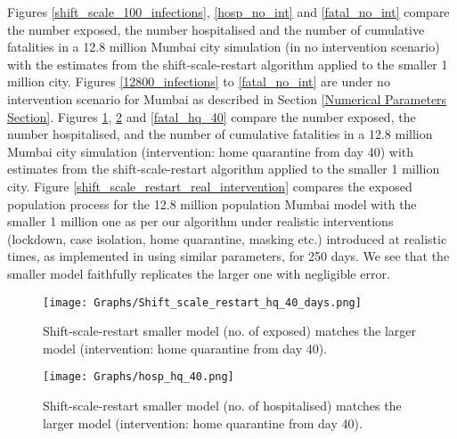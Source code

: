 \documentclass{article}
\theoremstyle{definition}
\begin{document}
Figures \ref{shift_scale_100_infections}, \ref{hosp_no_int} and \ref{fatal_no_int} compare the number exposed, the number hospitalised and the number of cumulative fatalities in a 12.8 million Mumbai city simulation (in no intervention scenario) with the estimates from the shift-scale-restart algorithm applied to the smaller 1 million city. Figures \ref{12800_infections} to \ref{fatal_no_int} are  under no intervention scenario for Mumbai
as described in Section \ref{Numerical Parameters Section}. Figures \ref{shift_scale_restart_1}, \ref{hosp_hq_40} and \ref{fatal_hq_40} compare
the  number exposed, the number  hospitalised, and the number of cumulative fatalities in a 12.8 million Mumbai city simulation (intervention: home quarantine from day 40) with estimates from the shift-scale-restart algorithm applied to the smaller 1 million city.
  Figure \ref{shift_scale_restart_real_intervention} compares the exposed population process for 
  the 12.8 million population Mumbai model with the smaller 1 million  one  as per our algorithm  
under realistic interventions (lockdown, case isolation, home quarantine, masking etc.) introduced at realistic times, as implemented in \cite{report2} using similar parameters, for 250 days. We see that the smaller model faithfully replicates the larger one with negligible error.


\begin{figure}
    \centering
    \texttt{[image: Graphs/Shift\_scale\_restart\_hq\_40\_days.png]}
  \caption{Shift-scale-restart smaller model (no. of exposed) matches the larger model (intervention: home quarantine from day 40). }
\label{shift_scale_restart_1}
  \end{figure}
  
  
  \begin{figure}
    \centering
    \texttt{[image: Graphs/hosp\_hq\_40.png]}
  \caption{Shift-scale-restart smaller model (no. of hospitalised) matches the larger model (intervention: home quarantine from day 40). }
\label{hosp_hq_40}
  \end{figure}
  
\end{document}
